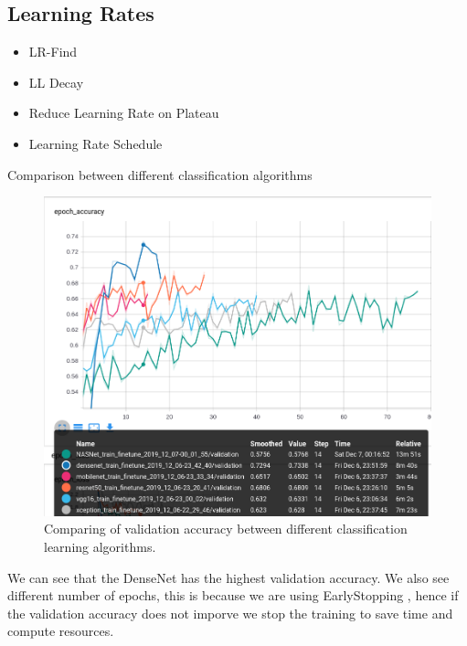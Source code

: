 \documentclass{article}
\begin{document}
\subsection{Learning Rates}

\begin{itemize}
    \item LR-Find
    \item LL Decay
    \item Reduce Learning Rate on Plateau
    \item Learning Rate Schedule
    
\end{itemize}

Comparison between different classification algorithms

\begin{figure}
    \centering
    \includegraphics[width=\linewidth]{data/images/05_Comparision/Classification_plot.png}
    \caption{Comparing of validation accuracy between different classification learning algorithms. \cite{Zoph_2018}  \cite{Huang_2017} \cite{howard2017mobilenets} \cite{he2016deep} \cite{simonyan2014deep} \cite{chollet2017xception} }
    \label{fig:my_label}
\end{figure}

We can see that the DenseNet has the highest validation accuracy. We also see different number of epochs, this is because we are using EarlyStopping \cite{geron2019hands}, hence if the validation accuracy does not imporve we stop the training to save time and compute resources. 
\end{document}

